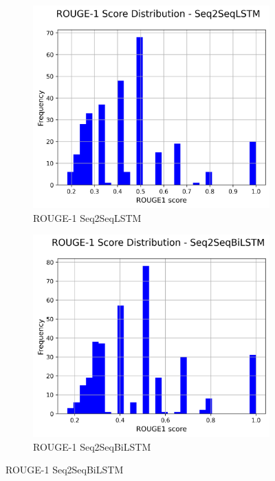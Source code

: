 \documentclass[a4paper, 12pt]{article}
\begin{document}
\begin{figure}[H]
    \centering
    \begin{subfigure}{0.32\textwidth}
        \centering
        \includegraphics[width=\textwidth]{media/Seq2SeqLSTM_rouge1_scores.png}
        \caption{ROUGE-1 Seq2SeqLSTM}
    \end{subfigure}
    \hfill
    \begin{subfigure}{0.32\textwidth}
        \centering
        \includegraphics[width=\textwidth]{media/Seq2SeqBiLSTM_rouge1_scores.png}
        \caption{ROUGE-1 Seq2SeqBiLSTM}
    \end{subfigure}
    

\end{figure}
\end{document}
